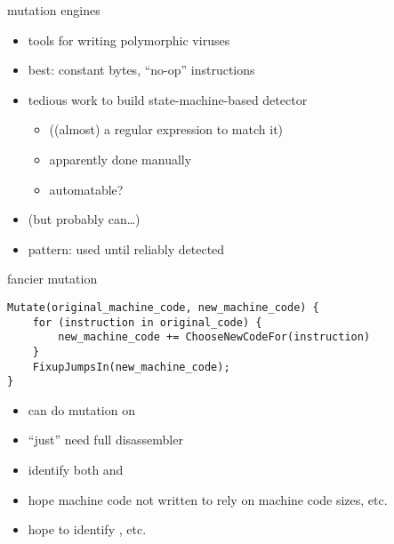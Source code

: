 
\begin{frame}{mutation engines}
    \begin{itemize}
    \item tools for writing polymorphic viruses
    \item best:  constant bytes,  ``no-op'' instructions
    \item tedious work to build state-machine-based detector
        \begin{itemize}
        \item ((almost) a regular expression to match it)
        \item apparently done manually
        \item automatable?
        \end{itemize}
    \item (but probably can\ldots)
    \item pattern: used until reliably detected
    \end{itemize}
\end{frame}

\begin{frame}[fragile,label=fancyMut]{fancier mutation}
\begin{lstlisting}[style=script]
Mutate(original_machine_code, new_machine_code) {
    for (instruction in original_code) {
        new_machine_code += ChooseNewCodeFor(instruction)
    }
    FixupJumpsIn(new_machine_code);
}
\end{lstlisting}
    \begin{itemize}
    \item can do mutation on 
    \vspace{.5cm}
    \item ``just'' need full disassembler
    \item identify both  and 
    \item hope machine code not written to rely on machine code sizes, etc.
    \item hope to identify , etc.
    \end{itemize}
\end{frame}

